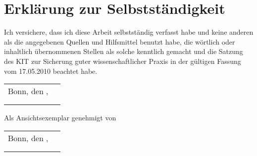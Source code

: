 \chapter*{Erklärung zur Selbstständigkeit}
Ich versichere, dass ich diese Arbeit selbstständig verfasst habe und keine %
anderen als die angegebenen Quellen und Hilfsmittel benutzt habe, die %
wörtlich oder inhaltlich übernommenen Stellen als solche kenntlich gemacht und %
die Satzung des KIT zur Sicherung guter wissenschaftlicher Praxis in der %
gültigen Fassung vom 17.05.2010 beachtet habe.\\

\vspace{1cm}

\renewcommand{\arraystretch}{0} %

\begin{flushright}
	\begin{tabular}{rr}
		Bonn, den \thesistimehandin, & \hspace*{5cm}\\[0mm]
		\cline{2-2}\\[2mm]    %
		& \thesisauthor       %
	\end{tabular}
\end{flushright}

\vfill

\begin{flushright}
	Als Ansichtsexemplar genehmigt von\\
	\vspace{1cm}
	\begin{tabular}{rr}
		Bonn, den \thesistimehandin, & \hspace*{5cm}\\[0mm]
		\cline{2-2}\\[2mm]    %
		& \thesisreviewerone  %
	\end{tabular}
\end{flushright}

\renewcommand{\arraystretch}{1}

\cleardoublepage
